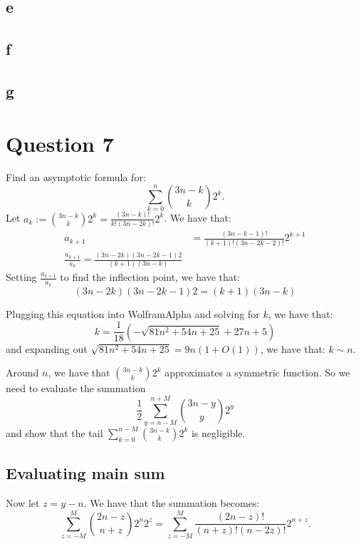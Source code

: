 \documentclass[]{article}
\theoremstyle{definition}
\numberwithin{theorem}{section}
\numberwithin{equation}{section}
\begin{document}
\subsection{e}

\subsection{f}

\subsection{g}
\section{Question 7}
Find an asymptotic formula for:
\begin{equation}
	\sum_{k = 0}^n \binom{3n - k}{k} 2^k.
\end{equation}
Let $a_k := \binom{3n - k}{k} 2^k = \frac{(3n - k)!}{k! (3n - 2k)!} 2^k$.
We have that:
\begin{align*}
	a_{k + 1} &= \frac{(3n - k - 1)!}{(k + 1)! (3n - 2k - 2)!} 2^{k + 1}\\
	\frac{a_{k + 1}}{a_k} = \frac{(3n - 2k)(3n - 2k - 1) 2}{(k + 1)(3n - k)}
\end{align*}
Setting $\frac{a_{k + 1}}{a_k}$ to find the inflection point, we have that:
\begin{equation}
	(3n - 2k)(3n - 2k - 1) 2 = (k + 1)(3n - k)
\end{equation}

Plugging this equation into WolframAlpha and solving for $k$, we have that:
\begin{equation}
	k = \frac{1}{18}\left(- \sqrt{81 n^2 + 54 n + 25} + 27 n + 5\right)
\end{equation}
and expanding out $\sqrt{81 n^2 + 54 n + 25} = 9 n(1 + O(1))$, we have that:
$k \sim n$. 

Around $n$, we have that $\binom{3n - k}{k} 2^k$ approximates a symmetric function. So we need to evaluate the summation
\begin{equation}
	\frac{1}{2}\sum_{y = n - M}^{n + M} \binom{3n - y}{y} 2^y
\end{equation}
and show that the tail $\sum_{k = 0}^{n - M} \binom{3n - k}{k} 2^k$ is negligible.

\subsection{Evaluating main sum}
Now let $z = y - n$. We have that the summation becomes:
\begin{equation}
	\sum_{z = -M}^M \binom{2n - z}{n + z} 2^n 2^z = \sum_{z = -M}^M\frac{(2n - z)!}{(n + z)! (n - 2z)!} 2^{n + z}. 
\end{equation}
\end{document}
